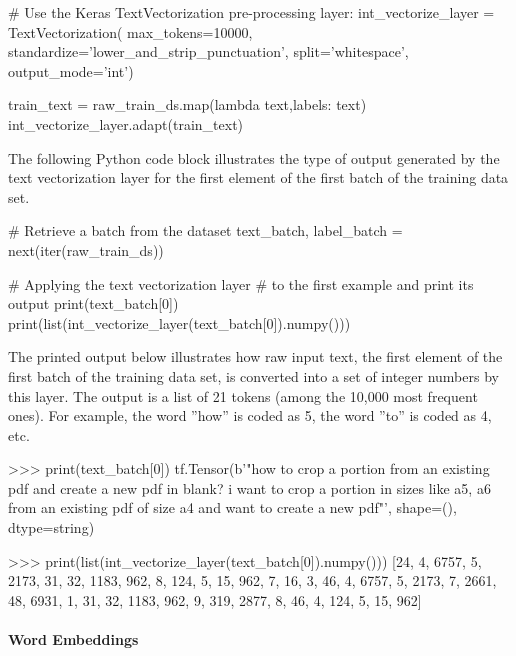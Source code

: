 \begin{samepage}
\begin{pythoncode}
# Use the Keras TextVectorization pre-processing layer:
int_vectorize_layer = TextVectorization(
    max_tokens=10000,
    standardize='lower_and_strip_punctuation',
    split='whitespace',
    output_mode='int')
    
train_text = raw_train_ds.map(lambda text,labels: text)
int_vectorize_layer.adapt(train_text)
\end{pythoncode}
\end{samepage}

The following Python code block illustrates the type of output generated by the text vectorization layer for the first element of the first batch of the training data set.

\begin{samepage}
\begin{pythoncode}
# Retrieve a batch from the dataset
text_batch, label_batch = next(iter(raw_train_ds))

# Applying the text vectorization layer
# to the first example and print its output
print(text_batch[0])
print(list(int_vectorize_layer(text_batch[0]).numpy()))
\end{pythoncode}
\end{samepage}

The printed output below illustrates how raw input text, the first element of the first batch of the training data set, is converted into a set of integer numbers by this layer. The output is a list of 21 tokens (among the 10,000 most frequent ones). For example, the word ''how'' is coded as 5, the word ''to'' is coded as 4, etc.

\begin{samepage}
\begin{textcode}
>>> print(text_batch[0])
tf.Tensor(b'"how to crop a portion from an existing pdf and create 
a new pdf in blank? i want to crop a portion in sizes like a5, a6 
from an existing pdf of size a4 and want to create a new pdf"\n', 
shape=(), dtype=string)

>>> print(list(int_vectorize_layer(text_batch[0]).numpy()))
[24, 4, 6757, 5, 2173, 31, 32, 1183, 962, 8, 124, 5, 15, 962, 7, 16, 
3, 46, 4, 6757, 5, 2173, 7, 2661, 48, 6931, 1, 31, 32, 1183, 962, 9, 
319, 2877, 8, 46, 4, 124, 5, 15, 962]
\end{textcode}
\end{samepage}

\paragraph*{Word Embeddings}

